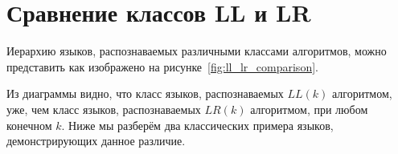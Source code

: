 \section{Сравнение классов LL и LR}
\label{sec:LLvsLR}


Иерархию языков, распознаваемых различными классами алгоритмов, можно представить как изображено на рисунке~\ref{fig:ll_lr_comparison}.

\begin{marginfigure}
\begin{center}
  
\end{center}
\caption{Соотношение между классами $LL(k)$ и $LR(k)$}
\label{fig:ll_lr_comparison}
\end{marginfigure}

Из диаграммы видно, что класс языков, распознаваемых $LL(k)$ алгоритмом, уже, чем класс языков, распознаваемых $LR(k)$ алгоритмом, при любом конечном $k$. Ниже мы разберём два классических примера языков, демонстрирующих данное различие.

